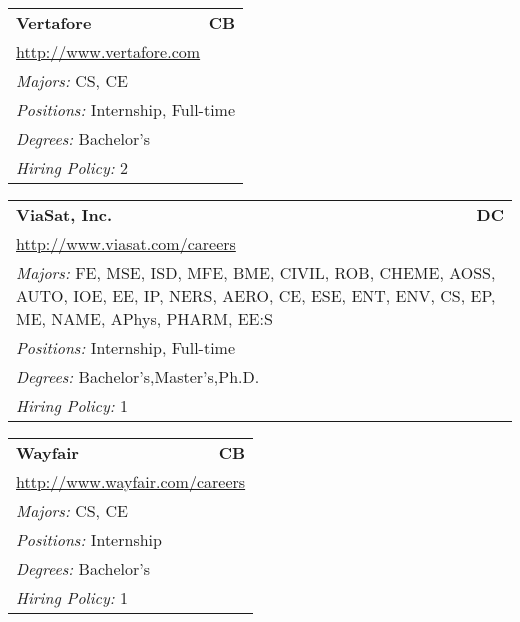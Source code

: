 \documentclass[twoside]{article}
\begin{document}
\begin{center}
\begin{multicols}{3}
\begin{FlushLeft}
\begin{minipage}{\columnwidth}
\end{minipage}
 
\begin{minipage}{\columnwidth}\begin{tabularx}{.95\columnwidth}{Xr}
                 {\Large\bf Vertafore} & {\Large\bf CB}\\
    \multicolumn{2}{p{.95\columnwidth}}{\url{http://www.vertafore.com}}\\
    \multicolumn{2}{p{.95\columnwidth}}{\emph{Majors:} CS, CE}\\
    \multicolumn{2}{p{.95\columnwidth}}{\emph{Positions:} Internship, Full-time}\\
    \multicolumn{2}{p{.95\columnwidth}}{\emph{Degrees:} Bachelor's}\\
    \multicolumn{2}{p{.95\columnwidth}}{\emph{Hiring Policy:} 2}\\
    \end{tabularx}
    
\end{minipage}
 
\begin{minipage}{\columnwidth}\begin{tabularx}{.95\columnwidth}{Xr}
                 {\Large\bf ViaSat, Inc.} & {\Large\bf DC}\\
    \multicolumn{2}{p{.95\columnwidth}}{\url{http://www.viasat.com/careers}}\\
    \multicolumn{2}{p{.95\columnwidth}}{\emph{Majors:} FE, MSE, ISD, MFE, BME, CIVIL, ROB, CHEME, AOSS, AUTO, IOE, EE, IP, NERS, AERO, CE, ESE, ENT, ENV, CS, EP, ME, NAME, APhys, PHARM, EE:S}\\
    \multicolumn{2}{p{.95\columnwidth}}{\emph{Positions:} Internship, Full-time}\\
    \multicolumn{2}{p{.95\columnwidth}}{\emph{Degrees:} Bachelor's,Master's,Ph.D.}\\
    \multicolumn{2}{p{.95\columnwidth}}{\emph{Hiring Policy:} 1}\\
    \end{tabularx}
    
\end{minipage}
 
\begin{minipage}{\columnwidth}\begin{tabularx}{.95\columnwidth}{Xr}
                 {\Large\bf Wayfair} & {\Large\bf CB}\\
    \multicolumn{2}{p{.95\columnwidth}}{\url{http://www.wayfair.com/careers}}\\
    \multicolumn{2}{p{.95\columnwidth}}{\emph{Majors:} CS, CE}\\
    \multicolumn{2}{p{.95\columnwidth}}{\emph{Positions:} Internship}\\
    \multicolumn{2}{p{.95\columnwidth}}{\emph{Degrees:} Bachelor's}\\
    \multicolumn{2}{p{.95\columnwidth}}{\emph{Hiring Policy:} 1}\\
    \end{tabularx}
    

\end{minipage}
\end{FlushLeft}
\end{multicols}
\end{center}
\end{document}
